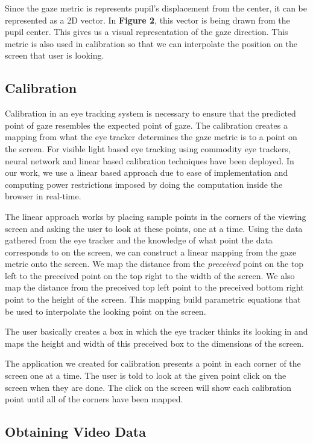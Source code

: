 \documentclass[annual]{acmsiggraph}
\begin{document}
 Since the gaze metric is represents pupil's displacement from the center, it
 can be represented as a 2D vector. In \textbf{Figure 2}, this vector is being
 drawn from the pupil center. This gives us a visual representation of the gaze
 direction. This metric is also used in calibration so that we can interpolate
 the position on the screen that user is looking.

\subsection{Calibration}

Calibration in an eye tracking system is necessary to ensure that the predicted
point of gaze resembles the expected point of gaze. The calibration creates a
mapping from what the eye tracker determines the gaze metric is to a point on
the screen. For visible light based eye tracking using commodity eye trackers,
neural network \cite{holland2012eye} and linear based calibration techniques
have been deployed. In our work, we use a linear based approach due to ease of
implementation and computing power restrictions imposed by doing the
computation inside the browser in real-time.

The linear approach works by placing sample points in the corners of the
viewing screen and asking the user to look at these points, one at a time.
Using the data gathered from the eye tracker and the knowledge of what point
the data corresponds to on the screen, we can construct a linear mapping from
the gaze metric onto the screen. We map the distance from the \emph{preceived}
point on the top left to the preceived point on the top right to the width of
the screen. We also map the distance from the preceived top left point to the
preceived bottom right point to the height of the screen. This mapping build
parametric equations that be used to interpolate the looking point on the
screen.

The user basically creates a box in which the eye tracker thinks its looking in
and maps the height and width of this preceived box to the dimensions of the
screen.

The application we created for calibration presents a point in each corner of
the screen one at a time. The user is told to look at the given point click on
the screen when they are done. The click on the screen will show each
calibration point until all of the corners have been mapped.

\subsection{Obtaining Video Data}
\end{document}
